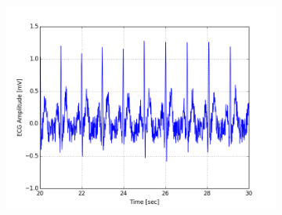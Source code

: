 \documentclass[paper=a4, fontsize=11pt]{scrartcl}
\numberwithin{equation}{section}		%
\numberwithin{figure}{section}			%
\numberwithin{table}{section}		    %
\begin{document}
\begin{appendices}
\begin{figure}[H]
\begin{subfigure}[b]{0.3\textwidth}
		\includegraphics[width=\textwidth]{sim/ecg_3}
	\end{subfigure}
\end{figure}


\end{appendices}
\end{document}
